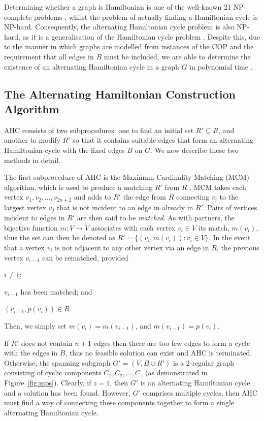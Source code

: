 \documentclass[authoryear]{elsarticle}
\begin{document}
Determining whether a graph is Hamiltonian is one of the well-known 21 NP-complete problems \cite{karp1972}, whilst the problem of actually finding a Hamiltonian cycle is NP-hard. Consequently, the alternating Hamiltonian cycle problem is also NP-hard, as it is a generalisation of the Hamiltonian cycle problem \citep{haggkvist1977}. Despite this, due to the manner in which graphs are modelled from instances of the COP and the requirement that all edges in $B$ must be included, we are able to determine the existence of an alternating Hamiltonian cycle in a graph $G$ in polynomial time \citep{hawa2018}.

\subsection{The Alternating Hamiltonian Construction Algorithm}
\label{sub:ahc}
\noindent AHC consists of two subprocedures: one to find an initial set $R' \subseteq R$, and another to modify $R'$ so that it contains suitable edges that form an alternating Hamiltonian cycle with the fixed edges $B$ on $G$. We now describe these two methods in detail.

The first subprocedure of AHC is the Maximum Cardinality Matching (MCM) algorithm, which is used to produce a matching $R'$ from $R$ \citep{mahadev1994}. MCM takes each vertex $v_1, v_2,\dotsc,v_{2n+2}$ and adds to $R'$ the edge from $R$ connecting $v_i$ to the largest vertex $v_j$ that is not incident to an edge in already in $R'$. Pairs of vertices incident to edges in $R'$ are then said to be \emph{matched}. As with partners, the bijective function $m : V \to V$ associates with each vertex $v_i \in V$ its match, $m(v_i)$, thus the set can then be denoted as $R' = \{(v_i, m(v_i)): v_i \in V\}$. In the event that a vertex $v_i$ is not adjacent to any other vertex via an edge in $R$, the previous vertex $v_{i-1}$ can be rematched, provided 
\begin{enumerate*}[label={(\alph*)}]
	\item $i \neq 1$;
	\item $v_{i-1}$ has been matched; and
	\item $(v_{i-1}, p(v_i)) \in R$.
\end{enumerate*} 
Then, we simply set $m(v_i) = m(v_{i-1})$, and $m(v_{i-1}) = p(v_i)$.

If $R'$ does not contain $n+1$ edges then there are too few edges to form a cycle with the edges in $B$, thus no feasible solution can exist and AHC is terminated. Otherwise, the spanning subgraph $G'=(V, B \cup R')$ is a 2-regular graph consisting of cyclic components $C_1,C_2,\dotsc,C_z$ (as demonstrated in Figure~\ref{fig:mps}). Clearly, if $z = 1$, then $G'$ is an alternating Hamiltonian cycle and a solution has been found. However, $G'$ comprises multiple cycles, then AHC must find a way of connecting these components together to form a single alternating Hamiltonian cycle.
\end{document}

